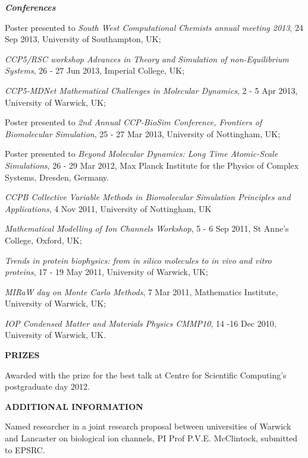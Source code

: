 \documentclass[a4paper,10pt,final]{memoir}
\newcommand{\Sep}{\vspace{1.em}}
\newcommand{\SmallSep}{\vspace{0.3em}}
\newcommand{\CVSection}[1]
	{\Large\textbf{#1}\par
	\SmallSep\normalsize\normalfont}
\newcommand{\CVItem}[2]
	{\textit{\textbf{\color{RoyalBlue} #1}} #2}
\begin{document}
\CVItem{Conferences} 
\begin{compactitem}[\color{RoyalBlue}$\circ$]
\item Poster presented to \textit{South West Computational Chemists annual meeting 2013},
  24 Sep 2013, University of Southampton, UK;
\item \textit{CCP5/RSC workshop Advances in Theory and Simulation of non-Equilibrium Systems},
  26 - 27 Jun 2013, Imperial College, UK;
\item \textit{CCP5-MDNet Mathematical Challenges in Molecular Dynamics}, 2 - 5 Apr 2013, University
  of Warwick, UK; 
\item Poster presented to \textit{2nd Annual CCP-BioSim Conference, Frontiers of Biomolecular
  Simulation}, 25 - 27 Mar 2013, University of Nottingham, UK;
\item Poster presented to \textit{Beyond Molecular Dynamics: Long Time Atomic-Scale Simulations}, 26 - 29 Mar 2012,
  Max Planck Institute for the Physics of Complex Systems, Dresden, Germany.
\item \textit{CCPB Collective Variable Methods in Biomolecular Simulation Principles and Applications},
4 Nov 2011, University of Nottingham, UK
\item \textit{Mathematical Modelling of Ion Channels Workshop}, 5 - 6 Sep 2011, St Anne's
  College, Oxford, UK;
\item \textit{Trends in protein biophysics: from in silico molecules to in vivo and vitro
  proteins}, 17 - 19 May 2011, University of Warwick, UK;
\item \textit{MIRaW day on Monte Carlo Methods}, 7 Mar 2011, Mathematics Institute, University
  of Warwick, UK;
\item \textit{IOP Condensed Matter and Materials Physics CMMP10}, 14 -16 Dec 2010, University of Warwick, UK.
\end{compactitem}

\Sep
\CVSection{PRIZES} 
Awarded with the prize for the best talk at Centre for Scientific Computing's postgraduate day 2012.

\Sep \CVSection{ADDITIONAL INFORMATION} Named researcher in a joint research proposal
between universities of Warwick and Lancaster on biological ion channels, PI Prof
P.V.E. McClintock, submitted to EPSRC.
\end{document}
